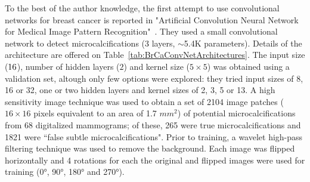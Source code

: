 \begin{comment} Lo1995
- detect microcalcifications
- only years after lecun showed it to be good on the mnist dataset.
- preselected images
- Background removal with wavelet high pass filtering ("a three-level wavelet transform was used and only the lowest frequency was eliminated for high-pass filtering before image reconstruction."). For lung nodules: Background removal like constrast enhancement.
- YES/NO output. For lung nodules: degrees of sensitivity in output(1-10) instead of disease/no disease . 
- Rotation and translation invariance. 0,90,180,270 and flipped over. (all of this on the small 32 by 32 images). No use of translation, it talks about it, though.
- Uses ROC/AUC.
- Each pixel represented 0.105 mm. (for instance 16 pixel input was 1.7mm)
- Same set used for validation and test
- using the data augmented versions one after the other in training gives better performance here (not sure why)
- 30-fold crossvalidation results reported (no test set): 0.89 AUC for individual miscrocalcifications and 0.97 for clustered microcalcif. 
- not quite clear if label were beningn/malign, microcalc/non-microcalc. It hink it is detection not diagonsis
- not clear how they measure the detection of microcalc. I think, of those microcalc detected from the normal algorithm if more than 3 were in the same 1 cm^2 area, it was considered as if the convnet detcted a cluster. 
- Easier to detect clusters these way because there could be 20 micorcalcif in a 1 cm^2 area and it only needs to detect 3.
- Bunch of questions on how on hell is this done. It could be done in a way that would help a lot the results, maybe that is why they have 0.97 AUC
\end{comment}
To the best of the author knowledge, the first attempt to use convolutional networks for breast cancer is reported in "Artificial Convolution Neural Network for Medical Image Pattern Recognition"~\cite{Lo1995}. 
They used a small convolutional network to detect microcalcifications (3 layers, $\sim$5.4K parameters). Details of the architecture are offered on Table~\ref{tab:BrCaConvNetArchitectures}. The input size ($16\time16$), number of hidden layers ($2$) and kernel size ($5\times5$) was obtained using a validation set, altough only few options were explored: they tried input sizes of 8, 16 or 32, one or two hidden layers and kernel sizes of 2, 3, 5 or 13.
A high sensitivity image technique was used to obtain a set of 2104 image patches ($16 \times 16$ pixels equivalent to an area of 1.7 $mm^2$) of potential microcalcifications from 68 digitalized mammograms; of these, 265 were true microcalcifications and 1821 were ``false subtle microcalcifications". Prior to training, a wavelet high-pass filtering technique was used to remove the background. Each image was flipped horizontally and 4 rotations for each the original and flipped images were used for training (0°, 90°, 180° and 270°).
